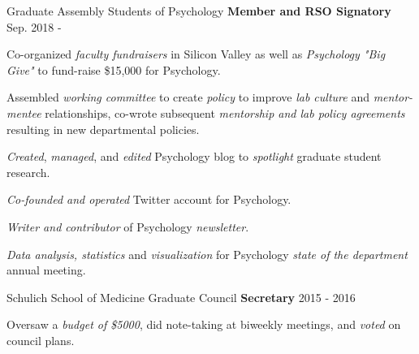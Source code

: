 

\begin{cventries}

  \cventry 
    {} %
    {Graduate Assembly Students of Psychology}
    {\textbf{Member and RSO Signatory}} %
    {Sep. 2018 - } %
    {
      \begin{cvitems} %
        \item {Co-organized \textit{faculty fundraisers} in Silicon Valley as well as \textit{Psychology "Big Give"} to fund-raise \$15,000 for Psychology.}
        \item {Assembled \textit{working committee} to create \textit{policy} to improve \textit{lab culture} and \textit{mentor-mentee} relationships, co-wrote subsequent \textit{mentorship and lab policy agreements} resulting in new departmental policies.}
        \item {\textit{Created}, \textit{managed}, and \textit{edited} Psychology blog to \textit{spotlight} graduate student research.}
        \item {\textit{Co-founded and operated} Twitter account for Psychology.}
        \item {\textit{Writer and contributor} of Psychology \textit{newsletter}.}
        \item {\textit{Data analysis, statistics} and \textit{visualization} for Psychology \textit{state of the department} annual meeting.}
      \end{cvitems}
    }
    
  \cventry
  	{} %
  	{Schulich School of Medicine Graduate Council} %
    {\textbf{Secretary}} %
    {2015 - 2016} %
    {
      \begin{cvitems} %
        \item {Oversaw a \textit{budget of \$5000}, did note-taking at biweekly meetings, and \textit{voted} on council plans.}
      \end{cvitems}
    }
    

\end{cventries}
